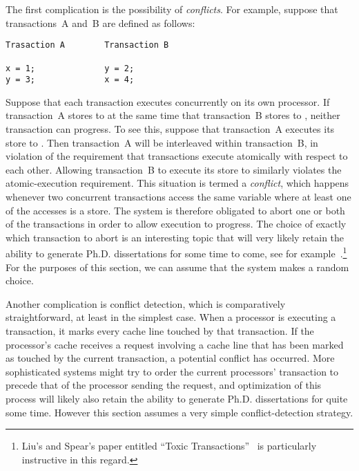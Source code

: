 The first complication is the possibility of \emph{conflicts}.
For example, suppose that transactions~A and~B are defined as follows:

\vspace{5pt}
\begin{minipage}[t]{\columnwidth}
\begin{verbatim}
Trasaction A        Transaction B

x = 1;              y = 2;
y = 3;              x = 4;
\end{verbatim}
\end{minipage}
\vspace{5pt}

Suppose that each transaction executes concurrently on its own processor.
If transaction~A stores to  at the same time that transaction~B
stores to , neither transaction can progress.
To see this, suppose that transaction~A executes its store to .
Then transaction~A will be interleaved within transaction~B, in violation
of the requirement that transactions execute atomically with respect to
each other.
Allowing transaction~B to execute its store to  similarly violates
the atomic-execution requirement.
This situation is termed a \emph{conflict}, which happens whenever two
concurrent transactions access the same variable where at least one of
the accesses is a store.
The system is therefore obligated to abort one or both of the transactions
in order to allow execution to progress.
The choice of exactly which transaction to abort is an interesting topic
that will very likely retain the ability to generate Ph.D. dissertations for
some time to come, see for
example~\cite{EgeAkpinar2011HTM2TLE}.\footnote{
	Liu's and Spear's paper entitled ``Toxic
	Transactions''~\cite{YujieLiu2011ToxicTransactions} is
	particularly instructive in this regard.}
For the purposes of this section, we can assume that the system makes
a random choice.

Another complication is conflict detection, which is comparatively
straightforward, at least in the simplest case.
When a processor is executing a transaction, it marks every cache line
touched by that transaction.
If the processor's cache receives a request involving a cache line that
has been marked as touched by the current transaction, a potential
conflict has occurred.
More sophisticated systems might try to order the current processors'
transaction to precede that of the processor sending the request,
and optimization of this process will likely also retain the ability
to generate Ph.D. dissertations for quite some time.
However this section assumes a very simple conflict-detection strategy.

